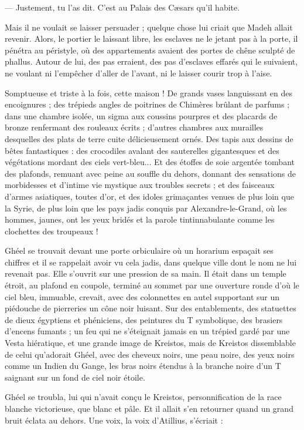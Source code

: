 \documentclass[a4paper, 11pt, oneside, polutonikogreek, french]{article}
\begin{document}
--- Justement, tu l'as dit. C'est au Palais des Cæsars qu'il habite.

Mais il ne voulait se laisser persuader ; quelque chose lui criait que Madeh allait revenir. Alors, le portier le laissant libre, les esclaves ne le jetant pas à la porte, il pénétra au péristyle, où des appartements avaient des portes de chêne sculpté de phallus. Autour de lui, des pas erraient, des pas d'esclaves effarés qui le suivaient, ne voulant ni l'empêcher d'aller de l'avant, ni le laisser courir trop à l'aise.

Somptueuse et triste à la fois, cette maison ! De grands vases languissant en des encoignures ; des trépieds angles de poitrines de Chimères brûlant de parfums ; dans une chambre isolée, un sigma aux coussins pourpres et des placards de bronze renfermant des rouleaux écrits ; d'autres chambres aux murailles desquelles des plats de terre cuite délicieusement ornés. Des tapis aux dessins de bêtes fantastiques : des crocodiles avalant des sauterelles gigantesques et des végétations mordant des ciels vert-bleu... Et des étoffes de soie argentée tombant des plafonds, remuant avec peine au souffle du dehors, donnant des sensations de morbidesses et d'intime vie mystique aux troubles secrets ; et des faisceaux d'armes asiatiques, toutes d'or, et des idoles grimaçantes venues de plus loin que la Syrie, de plus loin que les pays jadis conquis par Alexandre-le-Grand, où les hommes, jaunes, ont les yeux bridés et la parole tintinnabulante comme les clochettes des troupeaux !

Ghéel se trouvait devant une porte orbiculaire où un horarium espaçait ses chiffres et il se rappelait avoir vu cela jadis, dans quelque ville dont le nom ne lui revenait pas. Elle s'ouvrit sur une pression de sa main. Il était dans un temple étroit, au plafond en coupole, terminé au sommet par une ouverture ronde d'où le ciel bleu, immuable, crevait, avec des colonnettes en autel supportant sur un piédouche de pierreries un cône noir luisant. Sur des entablements, des statuettes de dieux égyptiens et phéniciens, des peintures du T symbolique, des brasiers d'encens fumants ; un feu qui ne s'éteignait jamais en un trépied gardé par une Vesta hiératique, et une grande image de Kreistos, mais de Kreistos dissemblable de celui qu'adorait Ghéel, avec des cheveux noirs, une peau noire, des yeux noirs comme un Indien du Gange, les bras noirs étendus à la branche noire d'un T saignant sur un fond de ciel noir étoile.

Ghéel se troubla, lui qui n'avait conçu le Kreistos, personnification de la race blanche victorieuse, que blanc et pâle. Et il allait s'en retourner quand un grand bruit éclata au dehors. Une voix, la voix d'Atillius, s'écriait :
\end{document}
